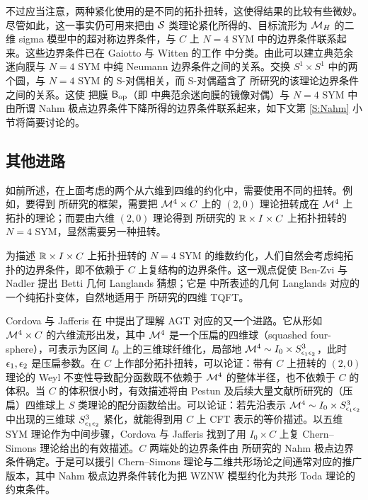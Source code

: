 不过应当注意，两种紧化使用的是不同的拓扑扭转，这使得结果的比较有些微妙。尽管如此，这一事实仍可用来把由 $\mathcal{S}$ 类理论紧化所得的、目标流形为 $\mathcal{M}_H$ 的二维 sigma 模型中的超对称边界条件，与 $C$ 上 $N=4$ SYM 中的边界条件联系起来。这些边界条件已在 Gaiotto 与 Witten 的工作\cite{GW1} 中分类。由此可以建立典范余迷向膜与 $N=4$ SYM 中纯 Neumann 边界条件之间的关系\cite{KW,GW}。交换 $S^1\times S^1$ 中的两个圆，与 $N=4$ SYM 的 S-对偶相关，而 S-对偶蕴含了 \cite{GW2} 所研究的该理论边界条件之间的关系。这使 \cite{GW} 把膜 $\mathsf{B}_{\rm op}$（即 \cite{NW} 中典范余迷向膜的镜像对偶）与 $N=4$ SYM 中由所谓 Nahm 极点边界条件下降所得的边界条件联系起来，如下文第 \ref{S:Nahm} 小节将简要讨论的。

\subsection{其他进路}

如前所述，在上面考虑的两个从六维到四维的约化中，需要使用不同的扭转。例如，要得到 \cite{NW} 所研究的框架，需要把 $\mathcal{M}^4\times C$ 上的 $(2,0)$ 理论扭转成在 $\mathcal{M}^4$ 上拓扑的理论；而要由六维 $(2,0)$ 理论得到 \cite{KW} 所研究的 $\mathbb{R}\times I\times C$ 上拓扑扭转的 $N=4$ SYM，显然需要另一种扭转。

为描述 $\mathbb{R}\times I\times C$ 上拓扑扭转的 $N=4$ SYM 的维数约化，人们自然会考虑纯拓扑的边界条件，即不依赖于 $C$ 上复结构的边界条件。这一观点促使 Ben-Zvi 与 Nadler \cite{BN16} 提出 Betti 几何 Langlands 猜想；它是 \cite{AG} 中所表述的几何 Langlands 对应的一个纯拓扑变体，自然地适用于 \cite{KW} 所研究的四维 TQFT。

Cordova 与 Jafferis 在 \cite{CJ} 中提出了理解 AGT 对应的又一个进路。它从形如 $\mathcal{M}^4\times C$ 的六维流形出发，其中 $\mathcal{M}^4$ 是一个压扁的四维球（squashed four-sphere），可表示为区间 $I_0$ 上的三维球纤维化，局部地 $\mathcal{M}^4\sim I_0 \times S^3_{\epsilon_1\epsilon_2}$，此时 $\epsilon_1,\epsilon_2$ 是压扁参数。在 $C$ 上作部分拓扑扭转，可以论证：带有 $C$ 上扭转的 $(2,0)$ 理论的 Weyl 不变性导致配分函数既不依赖于 $\mathcal{M}^4$ 的整体半径，也不依赖于 $C$ 的体积。当 $C$ 的体积很小时，有效描述将由 Pestun \cite{Pe} 及后续大量文献所研究的（压扁）四维球上 $S$ 类理论的配分函数给出。可以论证：若先沿表示 $\mathcal{M}^4\sim I_0 \times S^3_{\epsilon_1\epsilon_2}$ 中出现的三维球 $S^3_{\epsilon_1\epsilon_2}$ 紧化，就能得到用 $C$ 上 CFT 表示的等价描述。以五维 SYM 理论作为中间步骤，Cordova 与 Jafferis 找到了用 $I_0\times C$ 上复 Chern--Simons 理论给出的有效描述。$C$ 两端处的边界条件由 \cite{GW1,GW2,GW} 所研究的 Nahm 极点边界条件确定。于是可以援引 Chern--Simons 理论与二维共形场论之间通常对应的推广版本，其中 Nahm 极点边界条件转化为把 WZNW 模型约化为共形 Toda 理论的约束条件。

